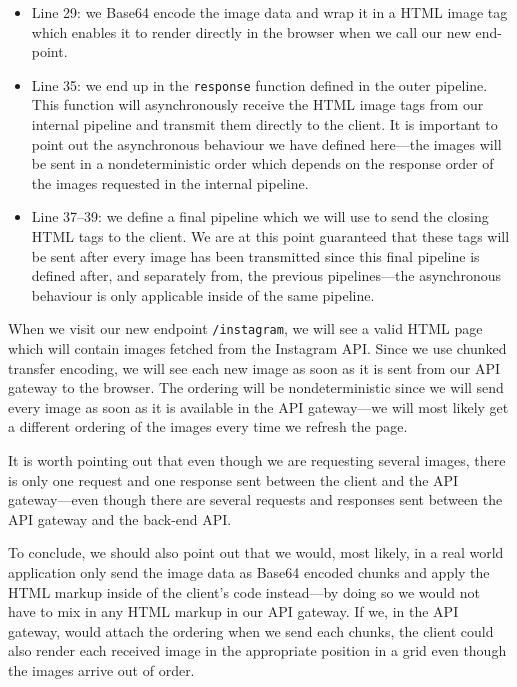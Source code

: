 \documentclass{cslthse-msc}
\begin{document}
\begin{itemize}
\item Line 29: we Base64 encode the image data and wrap it in a HTML image tag which enables it to render directly in the browser when we call our new end-point.

\item Line 35: we end up in the \lstinline{response} function defined in the outer pipeline. This function will asynchronously receive the HTML image tags from our internal pipeline and transmit them directly to the client. It is important to point out the asynchronous behaviour we have defined here---the images will be sent in a nondeterministic order which depends on the response order of the images requested in the internal pipeline.

\item Line 37--39: we define a final pipeline which we will use to send the closing HTML tags to the client. We are at this point guaranteed that these tags will be sent after every image has been transmitted since this final pipeline is defined after, and separately from, the previous pipelines---the asynchronous behaviour is only applicable inside of the same pipeline.

\end{itemize}

When we visit our new endpoint \lstinline{/instagram}, we will see a valid HTML page which will contain images fetched from the Instagram API. Since we use chunked transfer encoding, we will see each new image as soon as it is sent from our API gateway to the browser. The ordering will be nondeterministic since we will send every image as soon as it is available in the API gateway---we will most likely get a different ordering of the images every time we refresh the page.

It is worth pointing out that even though we are requesting several images, there is only one request and one response sent between the client and the API gateway---even though there are several requests and responses sent between the API gateway and the back-end API.

To conclude, we should also point out that we would, most likely, in a real world application only send the image data as Base64 encoded chunks and apply the HTML markup inside of the client's code instead---by doing so we would not have to mix in any HTML markup in our API gateway. If we, in the API gateway, would attach the ordering when we send each chunks, the client could also render each received image in the appropriate position in a grid even though the images arrive out of order.
\end{document}
